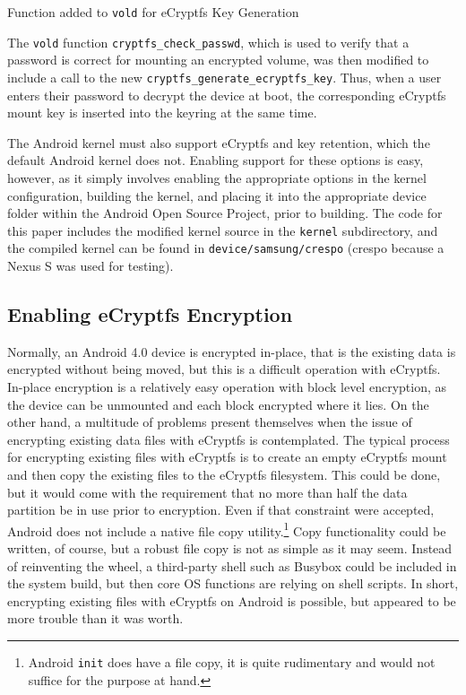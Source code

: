 \begin{table}[htpb]
 
\caption{Function added to \texttt{vold} for eCryptfs Key Generation}
\label{tab:generate-key}
\end{table}

The \texttt{vold} function \texttt{cryptfs\_check\_passwd}, which is used to verify that a password is correct for mounting an
encrypted volume, was then modified to include a call to the new \texttt{cryptfs\_generate\_ecryptfs\_key}. Thus, when a user enters
their password to decrypt the device at boot, the corresponding eCryptfs mount key is inserted into the keyring at the same time.

The Android kernel must also support eCryptfs and key retention, which the default Android kernel does not. Enabling support for
these options is easy, however, as it simply involves enabling the appropriate options in the kernel configuration, building the
kernel, and placing it into the appropriate device folder within the Android Open Source Project, prior to building. The code for
this paper includes the modified kernel source in the \texttt{kernel} subdirectory, and the compiled kernel can be found in
\texttt{device/samsung/crespo} (crespo because a Nexus S was used for testing).

\subsection{Enabling eCryptfs Encryption} Normally, an Android 4.0 device is encrypted in-place, that is the existing data is
encrypted without being moved, but this is a difficult operation with eCryptfs. In-place encryption is a relatively easy operation
with block level encryption, as the device can be unmounted and each block encrypted where it lies. On the other hand, a multitude of
problems present themselves when the issue of encrypting existing data files with eCryptfs is contemplated.  The typical process for
encrypting existing files with eCryptfs is to create an empty eCryptfs mount and then copy the existing files to the eCryptfs
filesystem.  This could be done, but it would come with the requirement that no more than half the data partition be in use prior to
encryption. Even if that constraint were accepted, Android does not include a native file copy utility.\footnote{Android
\texttt{init} does have a file copy, it is quite rudimentary and would not suffice for the purpose at hand.} Copy functionality
could be written, of course, but a robust file copy is not as simple as it may seem. Instead of reinventing the wheel, a third-party
shell such as Busybox could be included in the system build, but then core OS functions are relying on shell scripts. In short,
encrypting existing files with eCryptfs on Android is possible, but appeared to be more trouble than it was worth.

